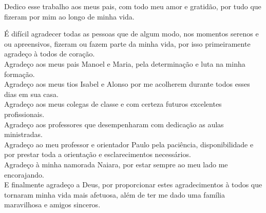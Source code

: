 \documentclass[a4paper,12pt]{monografia}
\begin{document}
%
  
%
\tecnologo {} 
%
 
\unidadeacademica{}
%
%
 

\maketitle
\begin{dedicatoria}
Dedico esse trabalho aos meus pais, com todo meu amor e gratidão, por tudo que fizeram por mim ao longo de minha vida.
\end{dedicatoria}

\noindent É difícil agradecer todas as pessoas que de algum modo, nos momentos serenos e ou apreensivos, fizeram ou fazem parte da minha vida, por isso primeiramente agradeço à todos de coração.\\
Agradeço aos meus pais Manoel e Maria, pela determinação e luta na minha formação.\\
Agradeço aos meus tios Isabel e Alonso por me acolherem durante todos esses dias em sua casa.\\
Agradeço aos meus colegas de classe e com certeza futuros excelentes profissionais.\\
Agradeço aos professores que desempenharam com dedicação as aulas ministradas.\\
Agradeço ao meu professor e orientador Paulo pela paciência, disponibilidade e por prestar toda a orientação e esclarecimentos necessários.\\
Agradeço à minha namorada Naiara, por estar sempre ao meu lado me encorajando.\\
E finalmente agradeço a Deus, por proporcionar estes agradecimentos à todos que tornaram minha vida mais afetuosa, além de ter me dado uma família maravilhosa e amigos sinceros.
\end{document}
